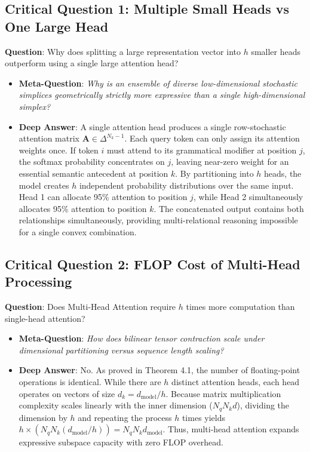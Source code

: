 \documentclass[11pt,a4paper]{article}
\theoremstyle{definition}
\begin{document}
\subsection{\textbf{Critical Question 1: Multiple Small Heads vs One Large Head}}
\textbf{Question}: Why does splitting a large representation vector into $h$ smaller heads outperform using a single large attention head?
\begin{itemize}
    \item \textbf{Meta-Question}: \emph{Why is an ensemble of diverse low-dimensional stochastic simplices geometrically strictly more expressive than a single high-dimensional simplex?}
    \item \textbf{Deep Answer}: A single attention head produces a single row-stochastic attention matrix $\mathbf{A} \in \Delta^{N_k - 1}$. Each query token can only assign its attention weights once. If token $i$ must attend to its grammatical modifier at position $j$, the softmax probability concentrates on $j$, leaving near-zero weight for an essential semantic antecedent at position $k$. By partitioning into $h$ heads, the model creates $h$ independent probability distributions over the same input. Head 1 can allocate 95\% attention to position $j$, while Head 2 simultaneously allocates 95\% attention to position $k$. The concatenated output contains both relationships simultaneously, providing multi-relational reasoning impossible for a single convex combination.
\end{itemize}

\subsection{\textbf{Critical Question 2: FLOP Cost of Multi-Head Processing}}
\textbf{Question}: Does Multi-Head Attention require $h$ times more computation than single-head attention?
\begin{itemize}
    \item \textbf{Meta-Question}: \emph{How does bilinear tensor contraction scale under dimensional partitioning versus sequence length scaling?}
    \item \textbf{Deep Answer}: No. As proved in Theorem 4.1, the number of floating-point operations is identical. While there are $h$ distinct attention heads, each head operates on vectors of size $d_k = d_{\text{model}} / h$. Because matrix multiplication complexity scales linearly with the inner dimension ($N_q N_k d$), dividing the dimension by $h$ and repeating the process $h$ times yields $h \times (N_q N_k (d_{\text{model}} / h)) = N_q N_k d_{\text{model}}$. Thus, multi-head attention expands expressive subspace capacity with zero FLOP overhead.
\end{itemize}
\end{document}
